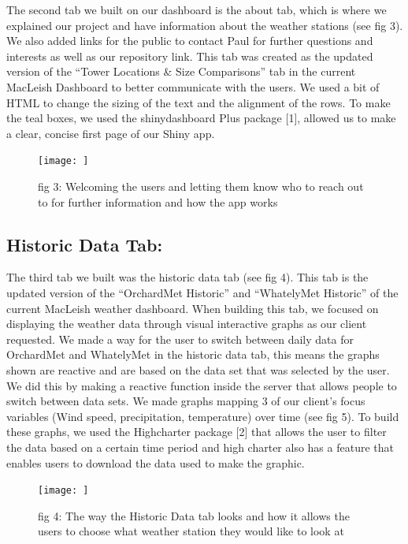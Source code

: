\documentclass[10pt,letterpaper]{article}
\begin{document}
The second tab we built on our dashboard is the about tab, which is
where we explained our project and have information about the weather
stations (see fig 3). We also added links for the public to contact Paul
for further questions and interests as well as our repository link. This
tab was created as the updated version of the ``Tower Locations \& Size
Comparisons'' tab in the current MacLeish Dashboard to better
communicate with the users. We used a bit of HTML to change the sizing
of the text and the alignment of the rows. To make the teal boxes, we
used the shinydashboard Plus package {[}1{]}, allowed us to make a
clear, concise first page of our Shiny app.

\begin{figure}
\texttt{[image: ]} \caption{fig 3: Welcoming the users and letting them know who to reach out to for further information and how the app works}\label{fig:unnamed-chunk-3}
\end{figure}

\subsection{Historic Data Tab:}\label{historic-data-tab}

The third tab we built was the historic data tab (see fig 4). This tab
is the updated version of the ``OrchardMet Historic'' and ``WhatelyMet
Historic'' of the current MacLeish weather dashboard. When building this
tab, we focused on displaying the weather data through visual
interactive graphs as our client requested. We made a way for the user
to switch between daily data for OrchardMet and WhatelyMet in the
historic data tab, this means the graphs shown are reactive and are
based on the data set that was selected by the user. We did this by
making a reactive function inside the server that allows people to
switch between data sets. We made graphs mapping 3 of our client's focus
variables (Wind speed, precipitation, temperature) over time (see fig
5). To build these graphs, we used the Highcharter package {[}2{]} that
allows the user to filter the data based on a certain time period and
high charter also has a feature that enables users to download the data
used to make the graphic.

\begin{figure}
\texttt{[image: ]} \caption{fig 4: The way the Historic Data tab looks and how it allows the users to choose what weather station they would like to look at}\label{fig:unnamed-chunk-4}
\end{figure}
\end{document}
